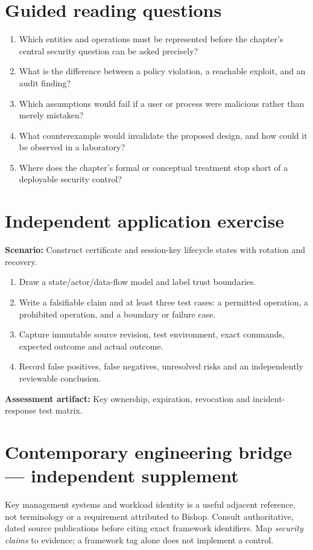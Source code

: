 \documentclass[10pt,letterpaper]{article}
\begin{document}
\section{Guided reading questions}
\begin{enumerate}
\item Which entities and operations must be represented before the chapter's central security question can be asked precisely?
\item What is the difference between a policy violation, a reachable exploit, and an audit finding?
\item Which assumptions would fail if a user or process were malicious rather than merely mistaken?
\item What counterexample would invalidate the proposed design, and how could it be observed in a laboratory?
\item Where does the chapter's formal or conceptual treatment stop short of a deployable security control?
\end{enumerate}
\section{Independent application exercise}
\textbf{Scenario:} Construct certificate and session-key lifecycle states with rotation and recovery.
\begin{enumerate}
\item Draw a state/actor/data-flow model and label trust boundaries.
\item Write a falsifiable claim and at least three test cases: a permitted operation, a prohibited operation, and a boundary or failure case.
\item Capture immutable source revision, test environment, exact commands, expected outcome and actual outcome.
\item Record false positives, false negatives, unresolved risks and an independently reviewable conclusion.
\end{enumerate}
\textbf{Assessment artifact:} Key ownership, expiration, revocation and incident-response test matrix.
\section{Contemporary engineering bridge --- independent supplement}
Key management systems and workload identity is a useful adjacent reference, not terminology or a requirement attributed to Bishop. Consult authoritative, dated source publications before citing exact framework identifiers. Map \emph{security claims} to evidence; a framework tag alone does not implement a control.
\end{document}
